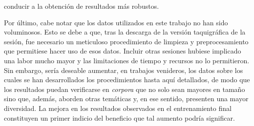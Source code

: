 conducir a la obtenci\'on de resultados m\'as robustos.
\par
Por \'ultimo, cabe notar que los datos utilizados en este trabajo
no han sido voluminosos. Esto se debe a que, tras la descarga
de la versi\'on taquigr\'afica de la sesi\'on, fue necesario un
meticuloso procedimiento de limpieza y preprocesamiento que permitiese
hacer uso de esos datos. Incluir otras sesiones hubiese implicado
una labor mucho mayor y las limitaciones de tiempo y recursos no
lo permitieron. Sin embargo, ser\'ia deseable aumentar, en trabajos
venideros, los datos sobre los cuales se han desarrollados los procedimientos
hasta aqu\'i detallados, de modo que los resultados puedan verificarse en
\textit{corpora} que no solo sean mayores en tamaño sino que, adem\'as,
aborden otras tem\'aticas y, en ese sentido, presenten una mayor
diversidad. La mejora en los resultados observados en el entrenamiento
final constituyen un primer indicio del beneficio que tal aumento podr\'ia
significar.